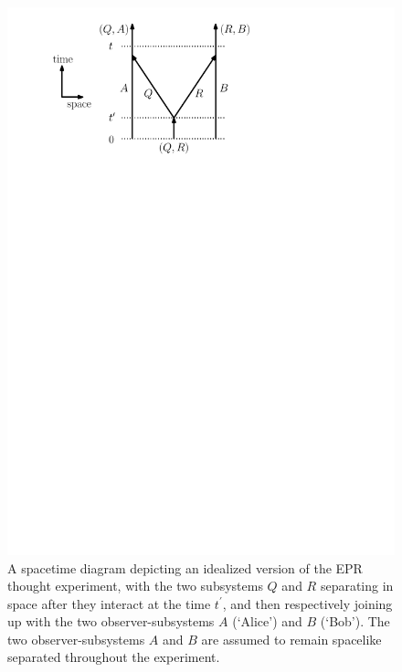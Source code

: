 \documentclass[twoside,twocolumn,english,prl,superscriptaddress,nobibnotes,nofootinbib]{revtex4-2}
\begin{document}
\begin{figure}

\includegraphics[scale=0.6]{EPRExperimentSpacetimeDiagram.pdf}\caption{\label{fig:EPRExperimentSpacetimeDiagram}A spacetime diagram depicting
an idealized version of the EPR thought experiment, with the two subsystems
$Q$ and $R$ separating in space after they interact at the time
$t^{\prime}$, and then respectively joining up with the two observer-subsystems
$A$ (\textquoteleft Alice\textquoteright ) and $B$ (\textquoteleft Bob\textquoteright ).
The two observer-subsystems $A$ and $B$ are assumed to remain spacelike
separated throughout the experiment.}

\end{figure}
\end{document}
